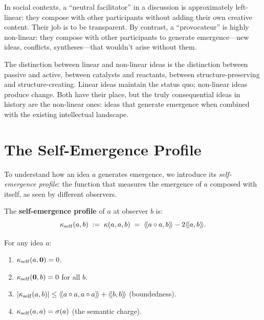 \begin{interpretation}
In social contexts, a ``neutral facilitator'' in a discussion is approximately
left-linear: they compose with other participants without adding their own
creative content. Their job is to be transparent. By contrast, a ``provocateur''
is highly non-linear: they compose with other participants to generate emergence---new
ideas, conflicts, syntheses---that wouldn't arise without them.

The distinction between linear and non-linear ideas is the distinction between
passive and active, between catalysts and reactants, between structure-preserving
and structure-creating. Linear ideas maintain the status quo; non-linear ideas
produce change. Both have their place, but the truly consequential ideas in
history are the non-linear ones: ideas that generate emergence when combined
with the existing intellectual landscape.
\end{interpretation}


\section{The Self-Emergence Profile}

To understand how an idea $a$ generates emergence, we introduce its
\emph{self-emergence profile}: the function that measures the emergence of $a$
composed with itself, as seen by different observers.

\begin{definition}
\label{def:self-emergence-profile}
The \textbf{self-emergence profile} of $a$ at observer $b$ is:
\[
  \kappa_{\mathrm{self}}(a, b) \;:=\; \kappa(a, a, b)
  \;=\; \langle\!\langle a \circ a, b \rangle\!\rangle - 2\langle\!\langle a, b \rangle\!\rangle.
\]
\end{definition}

\begin{theorem}
\label{thm:self-emergence-properties}
For any idea $a$:
\begin{enumerate}
  \item $\kappa_{\mathrm{self}}(a, \mathbf{0}) = 0$.
  \item $\kappa_{\mathrm{self}}(\mathbf{0}, b) = 0$ for all $b$.
  \item $|\kappa_{\mathrm{self}}(a, b)| \leq \langle\!\langle a \circ a, a \circ a \rangle\!\rangle + \langle\!\langle b, b \rangle\!\rangle$
    (boundedness).
  \item $\kappa_{\mathrm{self}}(a, a) = \sigma(a)$ (the semantic charge).
\end{enumerate}
\end{theorem}


